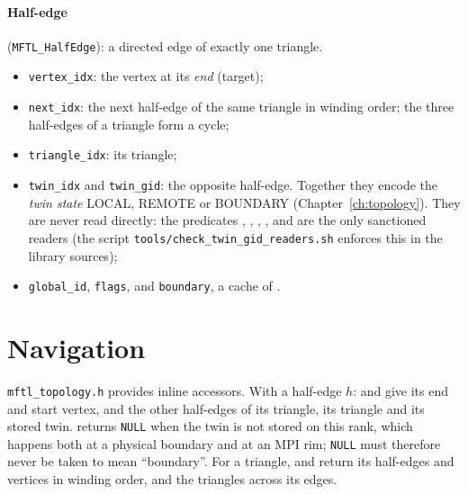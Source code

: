 \paragraph{Half-edge} (\texttt{MFTL\_HalfEdge}): a directed edge of exactly one triangle.
\begin{itemize}
  \item \texttt{vertex\_idx}: the vertex at its \emph{end} (target);
  \item \texttt{next\_idx}: the next half-edge of the same triangle in winding order; the three
    half-edges of a triangle form a cycle;
  \item \texttt{triangle\_idx}: its triangle;
  \item \texttt{twin\_idx} and \texttt{twin\_gid}: the opposite half-edge. Together they encode
    the \emph{twin state} LOCAL, REMOTE or BOUNDARY (Chapter~\ref{ch:topology}). They are
    never read directly: the predicates , ,
    , ,  and  are
    the only sanctioned readers (the script \texttt{tools/check\_twin\_gid\_readers.sh} enforces
    this in the library sources);
  \item \texttt{global\_id}, \texttt{flags}, and \texttt{boundary}, a cache of
    .
\end{itemize}

\section{Navigation}

\texttt{mftl\_topology.h} provides inline accessors. With a half-edge $h$:
 and  give its end and start vertex,  and
 the other half-edges of its triangle,  its triangle and
 its stored twin.  returns \texttt{NULL} when the twin is not
stored on this rank, which happens both at a physical boundary and at an MPI rim;
\texttt{NULL} must therefore never be taken to mean ``boundary''. For a triangle,
 and  return its half-edges and
vertices in winding order, and  the triangles across its edges.

